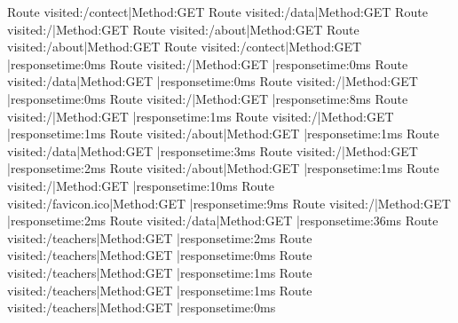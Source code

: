 Route visited:/contect|Method:GET
Route visited:/data|Method:GET
Route visited:/|Method:GET
Route visited:/about|Method:GET
Route visited:/about|Method:GET
Route visited:/contect|Method:GET |responsetime:0ms
Route visited:/|Method:GET |responsetime:0ms
Route visited:/data|Method:GET |responsetime:0ms
Route visited:/|Method:GET |responsetime:0ms
Route visited:/|Method:GET |responsetime:8ms
Route visited:/|Method:GET |responsetime:1ms
Route visited:/|Method:GET |responsetime:1ms
Route visited:/about|Method:GET |responsetime:1ms
Route visited:/data|Method:GET |responsetime:3ms
Route visited:/|Method:GET |responsetime:2ms
Route visited:/about|Method:GET |responsetime:1ms
Route visited:/|Method:GET |responsetime:10ms
Route visited:/favicon.ico|Method:GET |responsetime:9ms
Route visited:/|Method:GET |responsetime:2ms
Route visited:/data|Method:GET |responsetime:36ms
Route visited:/teachers|Method:GET |responsetime:2ms
Route visited:/teachers|Method:GET |responsetime:0ms
Route visited:/teachers|Method:GET |responsetime:1ms
Route visited:/teachers|Method:GET |responsetime:1ms
Route visited:/teachers|Method:GET |responsetime:0ms
